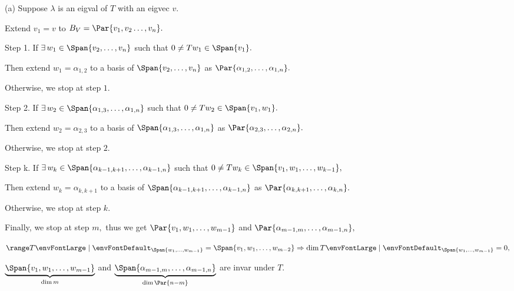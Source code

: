 \par\quad
(a) Suppose $\lambda$ is an eigval of $T$ with an eigvec $v.$ \par\quad\Ha
Extend $v_1=v$ to $B_V=\Par{v_1,v_2\dots,v_n}.$\par\quad\Ha
{\tgbfx Step 1.} If $\exists\,w_1\in\Span{v_2,\dots,v_n}$ such that $0\neq Tw_1\in\Span{v_1}.$\par\quad\Ha
{} Then extend $w_1=\alpha_{1,2}$ to a basis of $\Span{v_2,\dots,v_n}$ as $\Par{\alpha_{1,2},\dots,\alpha_{1,n}}.$\par\quad\Ha
{} Otherwise, we stop at step $1.$\par\quad\Ha
{\tgbfx Step 2.} If $\exists\,w_2\in\Span{\alpha_{1,3},\dots,\alpha_{1,n}}$ such that $0\neq Tw_2\in\Span{v_1,w_1}.$\par\quad\Ha
{} Then extend $w_2=\alpha_{2,3}$ to a basis of $\Span{\alpha_{1,3},\dots,\alpha_{1,n}}$ as $\Par{\alpha_{2,3},\dots,\alpha_{2,n}}.$\par\quad\Ha
{} Otherwise, we stop at step $2.$\par\quad\Ha
{\tgbfx Step k.} If $\exists\,w_k\in\Span{\alpha_{k-1,k+1},\dots,\alpha_{k-1,n}}$ such that $0\neq Tw_k\in\Span{v_1,w_1,\dots,w_{k-1}},$\par\quad\Ha
{} Then extend $w_k=\alpha_{k,k+1}$ to a basis of $\Span{\alpha_{k-1,k+1},\dots,\alpha_{k-1,n}}$ as $\Par{\alpha_{k,k+1},\dots,\alpha_{k,n}}.$\par\quad\Ha
{} Otherwise, we stop at step $k.$\par\vspace{4pt}\quad\Ha
Finally, we stop at step $m,$ thus we get $\Par{v_1,w_1,\dots,w_{m-1}}$ and $\Par{\alpha_{m-1,m},\dots,\alpha_{m-1,n}},$\par\quad\Ha
$\range T\envFontLarge\mid\envFontDefault_{\Span{w_1,\dots,w_{m-1}}}=\Span{v_1,w_1,\dots,w_{m-2}}\Rightarrow\dim\null T\envFontLarge\mid\envFontDefault_{\Span{w_1,\dots,w_{m-1}}}=0,$\par\quad\Ha
$\underbrace{\Span{v_1,w_1,\dots,w_{m-1}}}_{\dim m}$ and $\underbrace{\Span{\alpha_{m-1,m},\dots,\alpha_{m-1,n}}}_{\dim \Par{n-m}}$ are invar under $T.$\par\quad\Ha

